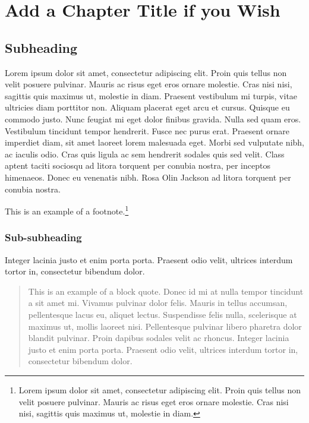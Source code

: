\chapter{Add a Chapter Title if you Wish}

\section{Subheading}

Lorem ipsum dolor sit amet, consectetur adipiscing elit. Proin quis tellus non velit posuere pulvinar. Mauris ac risus eget eros ornare molestie. Cras nisi nisi, sagittis quis maximus ut, molestie in diam. Praesent vestibulum mi turpis, vitae ultricies diam porttitor non. Aliquam placerat eget arcu et cursus. Quisque eu commodo justo. Nunc feugiat mi eget dolor finibus gravida. Nulla sed quam eros. Vestibulum tincidunt tempor hendrerit. Fusce nec purus erat. Praesent ornare imperdiet diam, sit amet laoreet lorem malesuada eget. Morbi sed vulputate nibh, ac iaculis odio. Cras quis ligula ac sem hendrerit sodales quis sed velit. Class aptent taciti sociosqu ad litora torquent per conubia nostra, per inceptos himenaeos. Donec eu venenatis nibh. Rosa Olin Jackson\cite{waveshaping} ad litora torquent per conubia nostra.

This is an example of a footnote.\footnote{Lorem ipsum dolor sit amet, consectetur adipiscing elit. Proin quis tellus non velit posuere pulvinar. Mauris ac risus eget eros ornare molestie. Cras nisi nisi, sagittis quis maximus ut, molestie in diam.}

\subsection{Sub-subheading}

Integer lacinia justo et enim porta porta. Praesent odio velit, ultrices interdum tortor in, consectetur bibendum dolor.

\begin{quote}
This is an example of a block quote. Donec id mi at nulla tempor tincidunt a sit amet mi. Vivamus pulvinar dolor felis. Mauris in tellus accumsan, pellentesque lacus eu, aliquet lectus. Suspendisse felis nulla, scelerisque at maximus ut, mollis laoreet nisi. Pellentesque pulvinar libero pharetra dolor blandit pulvinar. Proin dapibus sodales velit ac rhoncus. Integer lacinia justo et enim porta porta. Praesent odio velit, ultrices interdum tortor in, consectetur bibendum dolor.
\end{quote}

